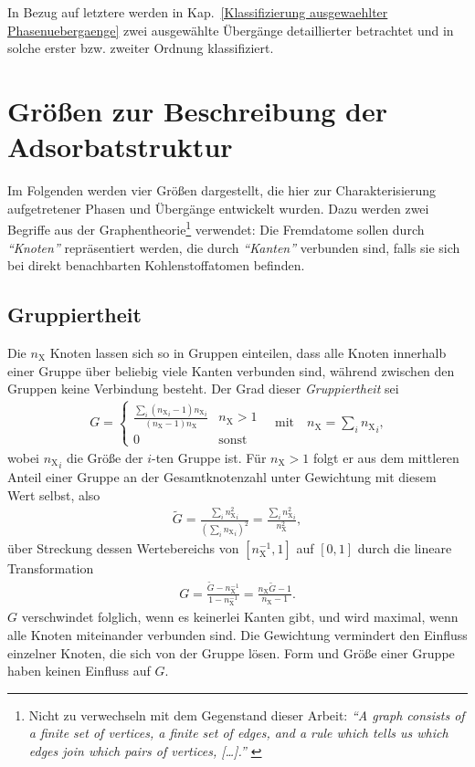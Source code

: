 \documentclass[a4paper, 10pt, twoside, openany]{book} %
\def \nX {n_\mathrm{X}}
\begin{document}
	In Bezug auf letztere werden in Kap.~\ref{Klassifizierung ausgewaehlter Phasenuebergaenge} zwei ausgewählte Übergänge detaillierter betrachtet und in solche erster bzw. zweiter Ordnung klassifiziert.
	
	\section{Größen zur Beschreibung der Adsorbatstruktur}
	\label{beschreibende Groessen}
	
	Im Folgenden werden vier Größen dargestellt, die hier zur Charakterisierung aufgetretener Phasen und Übergänge entwickelt wurden. Dazu werden zwei Begriffe aus der Graphentheorie\footnote{Nicht zu verwechseln mit dem Gegenstand dieser Arbeit: \emph{"`A graph consists of a finite set of vertices, a finite set of edges, and a rule which tells us which edges join which pairs of vertices, \emph{[\dots]}."' \cite[S. 9]{Biggs}}} verwendet: Die Fremdatome sollen durch \emph{"`Knoten"'} repräsentiert werden, die durch \emph{"`Kanten"'} verbunden sind, falls sie sich bei direkt benachbarten Kohlenstoffatomen befinden.
	
	\subsection{Gruppiertheit}
	
	Die $\nX$ Knoten lassen sich so in Gruppen einteilen, dass alle Knoten innerhalb einer Gruppe über beliebig viele Kanten verbunden sind, während zwischen den Gruppen keine Verbindung besteht. Der Grad dieser \emph{Gruppiertheit} sei
	\begin{align*}
		G = \begin{cases} \frac{\sum_i ({\nX}_i - 1) {\nX}_i}{(\nX - 1) \nX} & \nX > 1 \\ 0 & \text{sonst} \end{cases} \quad \text{mit} \quad \nX = \sum_i {\nX}_i,
	\end{align*}
	wobei ${\nX}_i$ die Größe der $i$-ten Gruppe ist. Für $\nX > 1$ folgt er aus dem mittleren Anteil einer Gruppe an der Gesamtknotenzahl unter Gewichtung mit diesem Wert selbst, also
	\begin{align*}
		\tilde G = \frac{\sum_i {\nX^2}_i}{(\sum_i {\nX}_i)^2} = \frac{\sum_i {\nX^2}_i}{\nX^2},
	\end{align*}
	über Streckung dessen Wertebereichs von $[\nX^{-1}, 1]$ auf $[0, 1]$ durch die lineare Transformation
	\begin{align*}
		G = \frac{\tilde G - \nX^{-1}}{1 - \nX^{-1}} = \frac{\nX \tilde G - 1}{\nX - 1}.
	\end{align*}
	$G$ verschwindet folglich, wenn es keinerlei Kanten gibt, und wird maximal, wenn alle Knoten miteinander verbunden sind. Die Gewichtung vermindert den Einfluss einzelner Knoten, die sich von der Gruppe lösen. Form und Größe einer Gruppe haben keinen Einfluss auf $G$.
	
\end{document}
